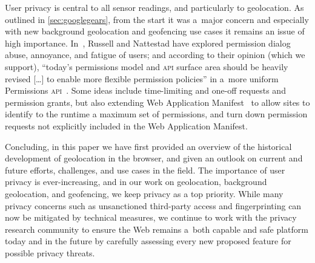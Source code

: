 \documentclass[sigconf,hyphens]{acmart}
\begin{document}
User privacy is central to all sensor readings, and particularly to geolocation.
As outlined in \autoref{sec:googlegears}, from the start it was a~major concern
and especially with new background geolocation and geofencing use cases
it remains an issue of high importance.
In~\cite{russell2018permissions}, Russell and Nattestad have explored permission dialog
abuse, annoyance, and fatigue of users; and according to their opinion (which we support),
``today's permissions model and \textsc{api} surface area should be heavily revised
[\ldots] to enable more flexible permission policies'' in a~more uniform
Permissions \textsc{api}~\cite{lamouri2017permissions}.
Some ideas include time-limiting and one-off requests and permission grants, but also
extending Web Application Manifest~\cite{caceres2018manifest}
to allow sites to identify to the runtime a maximum set of permissions,
and turn down permission requests not explicitly included in the Web Application Manifest.

Concluding, in this paper we have first provided an overview
of the historical development of geolocation in the browser,
and given an outlook on current and future efforts, challenges, and use cases in the field.
The importance of user privacy is ever-increasing, and in our work on geolocation,
background geolocation, and geofencing,
we keep privacy as a top priority.
While many privacy concerns such as unsanctioned third-party access and fingerprinting
can now be mitigated by technical measures, we continue to work with the privacy research community
to ensure the Web remains a~both capable and safe platform today and in the future
by carefully assessing every new proposed feature for possible privacy threats.



\end{document}
